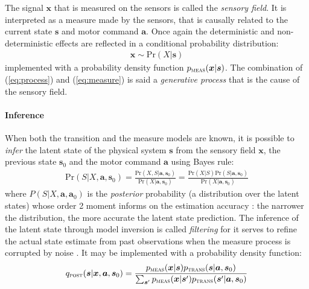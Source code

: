 \documentclass[12pt,twoside,openright]{article}
\begin{document}
The signal $\boldsymbol{x}$ that is measured on the sensors is called the \emph{sensory field}. It is interpreted as a measure made by the sensors, that is causally related to the current state $\boldsymbol{s}$ and motor command $\boldsymbol{a}$. Once again the deterministic and non-deterministic effects are reflected in a conditional probability distribution:
\begin{align}
\boldsymbol{x} \sim \text{Pr}(X|\boldsymbol{s})\label{eq:measure}
\end{align}
implemented with a probability density function 
$p_\text{\sc meas}(\boldsymbol{x}|\boldsymbol{s})$.
The combination of  (\ref{eq:process}) and (\ref{eq:measure}) is said a \emph{generative process} that is the cause of the sensory field. 


\paragraph{Inference}

When both the transition and the measure models are known, it is possible to \emph{infer} the latent state of the physical system $\boldsymbol{s}$ from the sensory field $\boldsymbol{x}$, the previous state $\boldsymbol{s}_0$ and the motor command $\boldsymbol{a}$ using Bayes rule:
\begin{align}
\text{Pr}(S|X,\boldsymbol{a},\boldsymbol{s}_0) = \frac{\text{Pr}(X,S|\boldsymbol{a},\boldsymbol{s}_0)}{\text{Pr}(X|\boldsymbol{a},\boldsymbol{s}_0)} %
= \frac{\text{Pr}(X|S) \text{Pr}(S|\boldsymbol{a},\boldsymbol{s}_0)}
{\text{Pr}(X|\boldsymbol{a},\boldsymbol{s}_0)}\label{eq:post-Pr}
\end{align}
where $P(S|X,\boldsymbol{a},\boldsymbol{a}_0)$ is the \emph{posterior} probability (a distribution over the latent states) whose order 2 moment informs on the estimation accuracy : the narrower the distribution, the more accurate the latent state prediction. 
The inference of the latent state through model inversion is called \emph{filtering} for it serves to refine the actual state estimate from past observations when the measure process is corrupted by noise \cite{Kalman1960}.
It may be implemented with a probability density function:
\begin{align}
q_\text{\sc post}(\boldsymbol{s}|\boldsymbol{x},\boldsymbol{a}, \boldsymbol{s}_0) 
= \frac{p_\text{\sc meas}(\boldsymbol{x}|\boldsymbol{s}) p_\text{\sc trans}(\boldsymbol{s}|\boldsymbol{a},\boldsymbol{s}_0)}
{\sum_{\boldsymbol{s}'}p_\text{\sc meas}(\boldsymbol{x}|\boldsymbol{s}') p_\text{\sc trans}(\boldsymbol{s}'|\boldsymbol{a},\boldsymbol{s}_0)}\label{eq:post-pdf}
\end{align}
\end{document}
